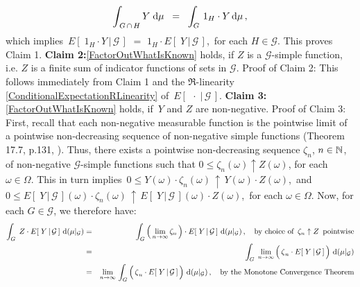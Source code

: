 \begin{enumerate}
\begin{equation*}
	\int_{\,G\,\cap\,H} Y\;\textnormal{d}\mu
	\;\; = \;\;
	\int_{G}\,1_{H} \cdot Y\,\textnormal{d}\mu\,,
	\end{equation*}
	which implies \,$E\!\left[\;1_{H}\cdot Y\,\vert\,\mathcal{G}\,\right]$
	$=$ $1_{H}\cdot E\!\left[\;Y\,\vert\,\mathcal{G}\,\right]$,\,
	for each $H \in \mathcal{G}$.
	This proves Claim 1.
	\vskip 0.4cm
	\textbf{Claim 2:}\;\;\eqref{FactorOutWhatIsKnown} holds, if $Z$ is a $\mathcal{G}$-simple function,
	i.e. $Z$ is a finite sum of indicator functions of sets in $\mathcal{G}$.
	\vskip 0.0cm
	Proof of Claim 2: This follows immediately from Claim 1 and
	the $\Re$-linearity \eqref{ConditionalExpectationRLinearity} of \,$E\!\left[\;\,\cdot\;\vert\,\mathcal{G}\,\right]$.
	\vskip 0.4cm
	\textbf{Claim 3:}\;\;\eqref{FactorOutWhatIsKnown} holds, if \,$Y$ and $Z$ are non-negative.
	\vskip 0.0cm
	Proof of Claim 3: First, recall that each non-negative measurable function is the pointwise limit
	of a pointwise non-decreasing sequence of non-negative simple functions (Theorem 17.7, p.131, \cite{Aliprantis1998}).
	Thus, there exists a pointwise non-decreasing sequence $\zeta_{n}$, $n \in \mathbb{N}$, of non-negative
	$\mathcal{G}$-simple functions such that $0 \leq \zeta_{n}(\omega) \uparrow Z(\omega)$, for each $\omega \in \Omega$.
	This in turn implies
	\,$0 \leq Y(\omega) \cdot \zeta_{n}(\omega) \,\uparrow\, Y(\omega) \cdot Z(\omega)$,\,
	and
	\,$0 \leq E\!\left[\;Y\,\vert\,\mathcal{G}\,\right](\omega) \cdot \zeta_{n}(\omega) \,\uparrow\, E\!\left[\;Y\,\vert\,\mathcal{G}\,\right](\omega) \cdot Z(\omega)$,\,
	for each $\omega \in \Omega$.
	Now, for each $G \in \mathcal{G}$, we therefore have:
	\begin{eqnarray*}
	\int_{G}\;Z \cdot E\!\left[\;Y\,\vert\,\mathcal{G}\,\right]\,\d(\mu\vert_{\mathcal{G}})
	&=&
		\int_{G}
			\left(\,\underset{n\rightarrow\infty}{\lim}\,\zeta_{n}\,\right)
			\cdot
			E\!\left[\;Y\,\vert\,\mathcal{G}\,\right]
			\,\d(\mu\vert_{\mathcal{G}})
			\,,\quad\textnormal{by choice of \,$\zeta_{n}\uparrow Z$\, pointwise}
	\\
	&=&
		\int_{G}\;
			\underset{n\rightarrow\infty}{\lim}\left(\,
				\overset{{\color{white}.}}{\zeta}_{n} \cdot E\!\left[\;Y\,\vert\,\mathcal{G}\,\right]
				\,\right)
			\,\d(\mu\vert_{\mathcal{G}})
	\\
	&=&
		\underset{n\rightarrow\infty}{\lim}\,
			\int_{G}\left(\,
				\overset{{\color{white}.}}{\zeta}_{n} \cdot E\!\left[\;Y\,\vert\,\mathcal{G}\,\right]
				\,\right)
			\,\d(\mu\vert_{\mathcal{G}})
			\,,\quad\textnormal{by the Monotone Convergence Theorem}
	\\

\end{eqnarray*}
\end{enumerate}
